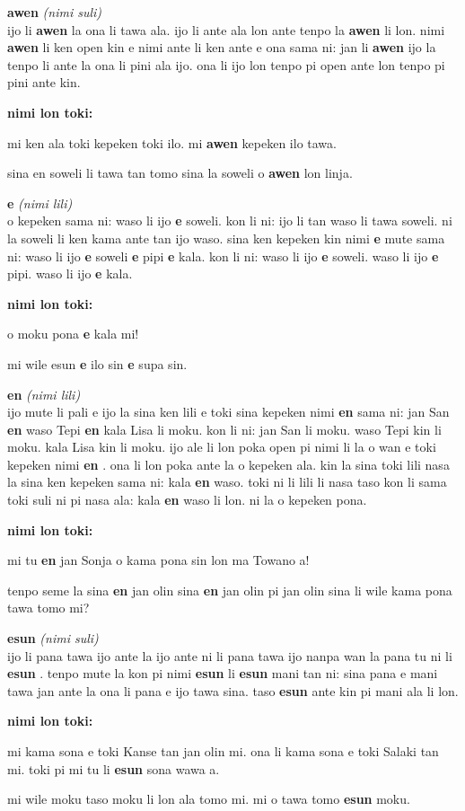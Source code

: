 \documentclass[a4paper,11pt]{book}
\newenvironment{definition}[2]{ %
  \begin{description}
  \item
    {\huge \textbf{#1}}
    {\Large \textit{(#2)}} \\
}{
  \end{description}%
}
\newenvironment{example}{ %
  \item
  \textbf{nimi lon toki:}
  
  \hfill
  \begin{minipage}{\dimexpr\textwidth-1cm}
  \begin{itshape}
}
{
  \end{itshape}
  \end{minipage}
}
\newcommand{\inex}[1]{%
  \textbf{#1}%
}
\begin{document}
\begin{definition}{awen}{nimi suli}
  ijo li \inex{awen} la ona li tawa ala. ijo li ante ala lon ante tenpo la \inex{awen} li lon. nimi \inex{awen} li ken open kin e nimi ante li ken ante e ona sama ni: jan li \inex{awen} ijo la tenpo li ante la ona li pini ala ijo. ona li ijo lon tenpo pi open ante lon tenpo pi pini ante kin.
  \begin{example}
    mi ken ala toki kepeken toki ilo. mi \inex{awen} kepeken ilo tawa.
    
    sina en soweli li tawa tan tomo sina la soweli o \inex{awen} lon linja.
  \end{example}
\end{definition}

\begin{definition}{e}{nimi lili}
  o kepeken sama ni: waso li ijo \inex{e} soweli. kon li ni: ijo li tan waso li tawa soweli. ni la soweli li ken kama ante tan ijo waso. sina ken kepeken kin nimi \inex{e} mute sama ni: waso li ijo \inex{e} soweli \inex{e} pipi \inex{e} kala. kon li ni: waso li ijo \inex{e} soweli. waso li ijo \inex{e} pipi. waso li ijo \inex{e} kala.
  \begin{example}
    o moku pona \inex{e} kala mi!
    
    mi wile esun \inex{e} ilo sin \inex{e} supa sin.
  \end{example}
\end{definition}

\begin{definition}{en}{nimi lili}
  ijo mute li pali e ijo la sina ken lili e toki sina kepeken nimi \inex{en} sama ni: jan San \inex{en} waso Tepi \inex{en} kala Lisa li moku. kon li ni: jan San li moku. waso Tepi kin li moku. kala Lisa kin li moku. ijo ale li lon poka open pi nimi li la o wan e toki kepeken nimi \inex{en}. ona li lon poka ante la o kepeken ala. kin la sina toki lili nasa la sina ken kepeken sama ni: kala \inex{en} waso. toki ni li lili li nasa taso kon li sama toki suli ni pi nasa ala: kala \inex{en} waso li lon. ni la o kepeken pona.
  \begin{example}
    mi tu \inex{en} jan Sonja o kama pona sin lon ma Towano a!
    
    tenpo seme la sina \inex{en} jan olin sina \inex{en} jan olin pi jan olin sina li wile kama pona tawa tomo mi?
  \end{example}
\end{definition}

\pagebreak

\begin{definition}{esun}{nimi suli}
  ijo li pana tawa ijo ante la ijo ante ni li pana tawa ijo nanpa wan la pana tu ni li \inex{esun}. tenpo mute la kon pi nimi \inex{esun} li \inex{esun} mani tan ni: sina pana e mani tawa jan ante la ona li pana e ijo tawa sina. taso \inex{esun} ante kin pi mani ala li lon.
  \begin{example}
    mi kama sona e toki Kanse tan jan olin mi. ona li kama sona e toki Salaki tan mi. toki pi mi tu li \inex{esun} sona wawa a.
    
    mi wile moku taso moku li lon ala tomo mi. mi o tawa tomo \inex{esun} moku.
  \end{example}
\end{definition}
\end{document}
